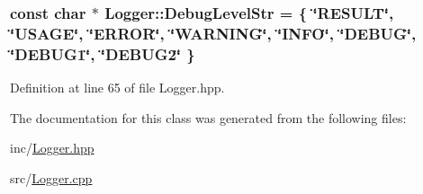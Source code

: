 \subsubsection[{Debug\+Level\+Str}]{\setlength{\rightskip}{0pt plus 5cm}const char $\ast$ Logger\+::\+Debug\+Level\+Str = \{ \char`\"{}R\+E\+S\+U\+L\+T\char`\"{}, \char`\"{}{\bf U\+S\+A\+G\+E}\char`\"{}, \char`\"{}{\bf E\+R\+R\+O\+R}\char`\"{}, \char`\"{}{\bf W\+A\+R\+N\+I\+N\+G}\char`\"{}, \char`\"{}{\bf I\+N\+F\+O}\char`\"{}, \char`\"{}{\bf D\+E\+B\+U\+G}\char`\"{}, \char`\"{}{\bf D\+E\+B\+U\+G1}\char`\"{}, \char`\"{}{\bf D\+E\+B\+U\+G2}\char`\"{} \}\hspace{0.3cm}{\ttfamily [static]}}\label{class_logger_a30344984f1f6d2a5896a52a4788e8b72}


Definition at line 65 of file Logger.\+hpp.



The documentation for this class was generated from the following files\+:\begin{DoxyCompactItemize}
\item 
inc/\hyperlink{_logger_8hpp}{Logger.\+hpp}\item 
src/\hyperlink{_logger_8cpp}{Logger.\+cpp}\end{DoxyCompactItemize}
